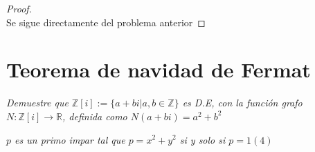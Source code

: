 \documentclass[11pt,letterpaper]{article}
\newcommand{\R}{\mathbb{R}}
\newcommand{\Z}{\mathbb{Z}}
\begin{document}
\begin{proof}\,\\
    Se sigue directamente del problema anterior
\end{proof}
\section{Teorema de navidad de Fermat}
\begin{tcolorbox}[  
    colback=CINVESTAV!10,   %
    colframe=CINVESTAV,     %
    title=\textcolor{white}{Enteros Gaussianos}
]
\textit{Demuestre que $\Z[i]:=\{a+bi|a,b\in \Z\}$ es D.E, con la funci\'on grafo $N:\Z[i]\to \R$, definida como
$N(a+bi)=a^2+b^2$}
\end{tcolorbox}
\begin{tcolorbox}[  
    colback=CINVESTAV!10,   %
    colframe=CINVESTAV,     %
    title=\textcolor{white}{Teorema de navidad de Fermat}
]
\textit{ $p$ es un primo impar tal que $p=x^2+y^2$ si y solo si $p=1(4)$}
\end{tcolorbox}
\end{document}
